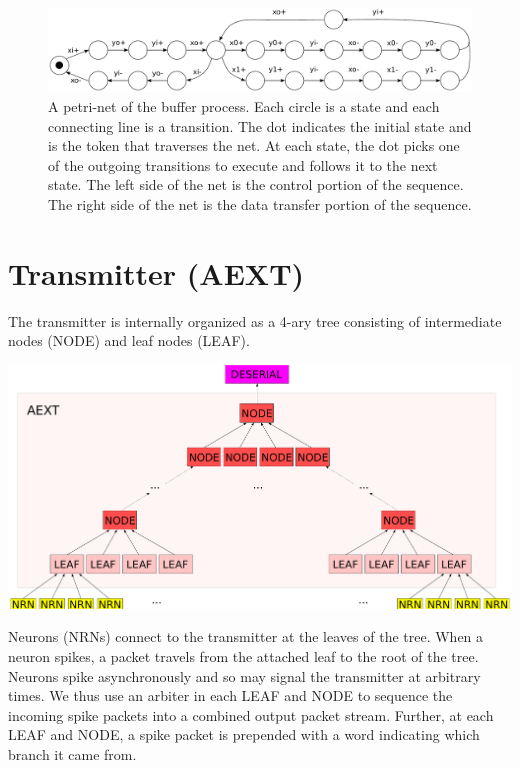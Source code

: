 \documentclass{article}
\begin{document}
\begin{figure}
    \centering
    \includegraphics[width=.95\textwidth]{img/serial_protocol_petri_net.pdf}
    \caption{A petri-net of the buffer process.
Each circle is a state and each connecting line is a transition. The dot
indicates the initial state and is the token that traverses the net.
At each state, the dot picks one of the outgoing transitions to execute
and follows it to the next state. The left side of the net is the control
portion of the sequence. The right side of the net is the data transfer
portion of the sequence.}
    \label{fig:protocol_net}
\end{figure}

\section{Transmitter (AEXT)}

The transmitter is internally organized as a 4-ary tree consisting of intermediate
nodes (NODE) and leaf nodes (LEAF).
\begin{center}
    \includegraphics[width=.7\textwidth]{img/aext.pdf}
\end{center}
Neurons (NRNs) connect to the transmitter at the leaves of the tree.
When a neuron spikes, a packet travels from the attached leaf to the root of 
the tree. Neurons spike asynchronously and so may signal the transmitter at 
arbitrary times. We thus use an arbiter in each LEAF and NODE to sequence the 
incoming spike packets into a combined output packet stream. Further, at each 
LEAF and NODE, a spike packet is prepended with a word indicating which 
branch it came from.

\end{document}
